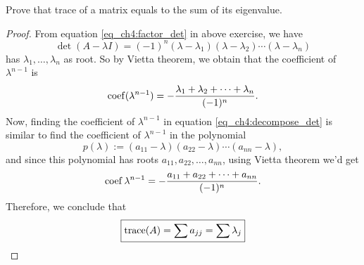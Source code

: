 \begin{exercise}
  Prove that trace of a matrix equals to the sum of its
  eigenvalue.
\end{exercise}
\begin{proof}
  From equation \eqref{eq_ch4:factor_det} in above exercise, 
  we have
  \[
    \det(A-\lambda I)
    =(-1)^n (\lambda-\lambda_1)(\lambda-\lambda_2)\cdots(\lambda-\lambda_n)
  \]
  has $\lambda_1,\dots,\lambda_n$ as root. So by Vietta theorem, 
  we obtain that the coefficient of $\lambda^{n-1}$ is 
  \[
    \operatorname{coef}(\lambda^{n-1})=-\frac{\lambda_1+\lambda_2+\cdots+\lambda_n}{(-1)^n}.
  \]
  Now, finding the coefficient of $\lambda^{n-1}$ in equation 
  \eqref{eq_ch4:decompose_det} is similar to find the coefficient of 
  $\lambda^{n-1}$ in the polynomial
  \[p(\lambda):=(a_{11}-\lambda)(a_{22}-\lambda)\cdots(a_{nn}-\lambda),\]
  and since this polynomial has roots $a_{11},a_{22},\dots,a_{nn}$, using
  Vietta theorem we'd get
  \[
    \operatorname{coef}{\lambda^{n-1}}=-\frac{a_{11}+a_{22}+\cdots+a_{nn}}{(-1)^n}.
  \]
  Therefore, we conclude that 
  \[
    \boxed{\operatorname{trace}(A)=\sum a_{jj}=\sum \lambda_j}
  \]
\end{proof}

